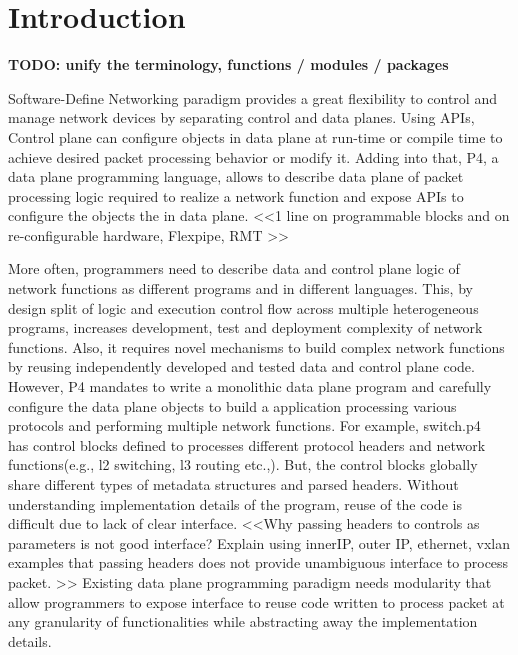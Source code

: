 \section{Introduction}

\textbf{TODO: unify the terminology, functions / modules / packages}


Software-Define Networking paradigm provides a great flexibility to control and manage network devices by separating control and data planes.
Using APIs, Control plane can configure objects in data plane at run-time or compile time to achieve desired packet processing behavior or modify it.
Adding into that, P4, a data plane programming language, allows to describe data plane of packet processing logic required to realize a network function and expose APIs to configure the objects the in data plane.
<<1 line on programmable blocks and on re-configurable hardware, Flexpipe, RMT >>

More often, programmers need to describe data and control plane logic of network functions as different programs and in different languages.
This, by design split of logic and execution control flow across multiple heterogeneous programs, increases development, test and deployment complexity of network functions.
Also, it requires novel mechanisms to build complex network functions by reusing independently developed and tested data and control plane code.
However, P4 mandates to write a monolithic data plane program and carefully configure the data plane objects to build a application processing various protocols and performing multiple network functions.
For example, switch.p4~\cite{switch.p4} has control blocks defined to processes different protocol headers and network functions(e.g., l2 switching, l3 routing etc.,). 
But, the control blocks globally share different types of metadata structures and parsed headers. 
Without understanding implementation details of the program, reuse of the code is difficult due to lack of clear interface.
<<Why passing headers to controls as parameters is not good interface?
Explain using innerIP, outer IP, ethernet, vxlan examples that passing headers does not provide unambiguous interface to process packet. 
>>
Existing data plane programming paradigm needs modularity that allow programmers to expose interface to reuse code written to process packet at any granularity of functionalities while abstracting away the implementation details.


